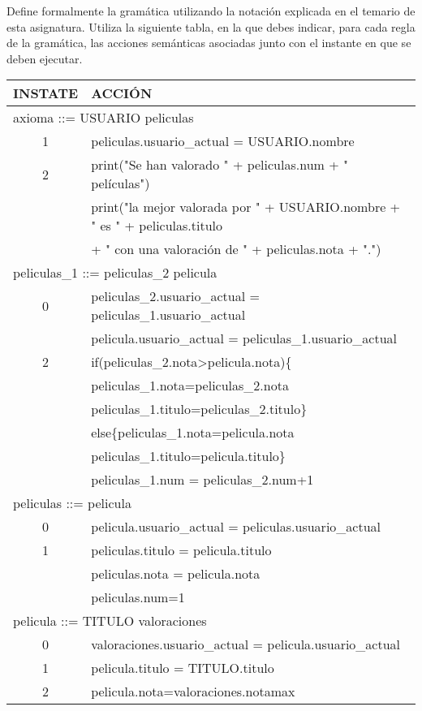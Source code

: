 \begin{problem}[2]
Define formalmente la gramática utilizando la notación explicada en el temario de esta asignatura. Utiliza la siguiente tabla, en la que debes indicar, para cada regla de la gramática, las acciones semánticas asociadas junto con el instante en que se deben ejecutar.
\solution
\begin{tabular}{|c|l|}
\hline
INSTATE & ACCIÓN \\
\hline
\multicolumn{2}{|l|}{axioma ::= USUARIO peliculas} \\
\hline
 1 & peliculas.usuario\_actual = USUARIO.nombre \\
\hline
 2 & print("Se han valorado " + peliculas.num + " películas") \\
 & print("la mejor valorada por " + USUARIO.nombre + " es " + peliculas.titulo \\ & + " con una valoración de " + peliculas.nota + ".")\\
 \hline
\multicolumn{2}{|l|}{peliculas\_1 ::= peliculas\_2 pelicula} \\
\hline
 0 & peliculas\_2.usuario\_actual = peliculas\_1.usuario\_actual \\ & pelicula.usuario\_actual = peliculas\_1.usuario\_actual\\
 \hline
 2 & if(peliculas\_2.nota>pelicula.nota)\{\\ &
 peliculas\_1.nota=peliculas\_2.nota\\ &
 peliculas\_1.titulo=peliculas\_2.titulo\}\\ &
 else\{peliculas\_1.nota=pelicula.nota\\ &
 peliculas\_1.titulo=pelicula.titulo\}\\ &
 peliculas\_1.num = peliculas\_2.num+1\\
\hline
\multicolumn{2}{|l|}{peliculas ::= pelicula} \\
\hline
 0 & pelicula.usuario\_actual = peliculas.usuario\_actual \\
 \hline
 1 & peliculas.titulo = pelicula.titulo \\ & peliculas.nota = pelicula.nota \\ &
 peliculas.num=1\\
\hline
\multicolumn{2}{|l|}{pelicula ::= TITULO valoraciones} \\
\hline
0 & valoraciones.usuario\_actual = pelicula.usuario\_actual \\
 \hline
 1 & pelicula.titulo = TITULO.titulo \\
 \hline
 2 & pelicula.nota=valoraciones.notamax\\

\end{tabular}
\end{problem}

